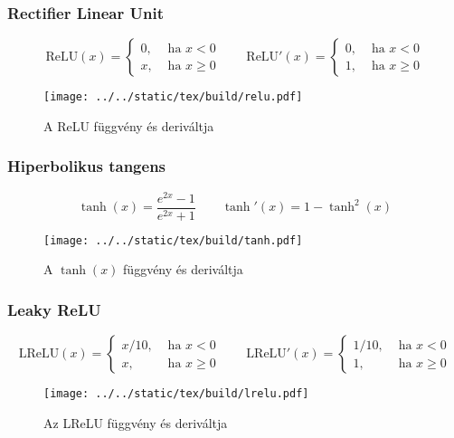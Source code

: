 \documentclass[../../main.tex]{subfiles}
\begin{document}
\subsubsection{Rectifier Linear Unit}
\[
  \mathrm{ReLU}(x) = \begin{cases}
    0, & \text{ ha } x < 0    \\
    x, & \text{ ha } x \geq 0
  \end{cases}
  \qquad
  \mathrm{ReLU}'(x) = \begin{cases}
    0, & \text{ ha } x < 0    \\
    1, & \text{ ha } x \geq 0
  \end{cases}
\]
\begin{figure}[H]
  \centering
  \texttt{[image: ../../static/tex/build/relu.pdf]}
  \caption{A ReLU függvény és deriváltja}
  \label{fig:relu}
\end{figure}

\subsubsection{Hiperbolikus tangens}
\[
  \tanh(x) = \frac{e^{2x} - 1}{e^{2x} + 1}
  \qquad
  \tanh'(x) = 1 - \tanh^2(x)
\]
\begin{figure}[H]
  \centering
  \texttt{[image: ../../static/tex/build/tanh.pdf]}
  \caption{A $\tanh(x)$ függvény és deriváltja}
  \label{fig:tanh}
\end{figure}

\subsubsection{Leaky ReLU}
\[
  \mathrm{LReLU}(x) = \begin{cases}
    x/10, & \text{ ha } x < 0    \\
    x,    & \text{ ha } x \geq 0
  \end{cases}
  \qquad
  \mathrm{LReLU}'(x) = \begin{cases}
    1/10, & \text{ ha } x < 0    \\
    1,    & \text{ ha } x \geq 0
  \end{cases}
\]
\begin{figure}[H]
  \centering
  \texttt{[image: ../../static/tex/build/lrelu.pdf]}
  \caption{Az LReLU függvény és deriváltja}
  \label{fig:lrelu}
\end{figure}
\end{document}
